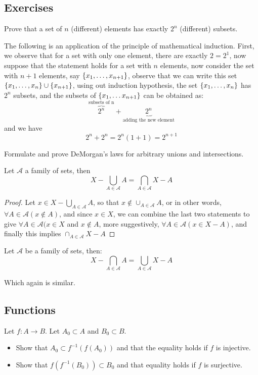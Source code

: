\subsection{Exercises}

\begin{exc}
	Prove that a set of $ n $ (different) elements has exactly $ 2^n  $ (different) subsets.
\end{exc}
\begin{sol}
	The following is an application of the principle of mathematical induction. First, we observe that for a set with only one element, there are exactly $ 2 = 2^1 $, now suppose that the statement holds for a set with $ n $ elements, now consider the set with $ n+1 $ elements, say $ \left\lbrace x_1, \ldots,x_{n+1} \right\rbrace $, observe that we can write this set $ \left\lbrace x_1, \ldots, x_n \right\rbrace \cup \left\lbrace x_{n+1} \right\rbrace $, using out induction hypothesis, the set $ \left\lbrace x_1, \ldots, x_n \right\rbrace $ has $ 2^n $ subsets, and the subsets of $ \left\lbrace x_1, \ldots x_{n+1} \right\rbrace $ can be obtained as:
	\[ \overbrace{2^n}^\text{subsets of n} + \underbrace{2^n}_\text{adding the new element}\]
	and we have
	\[ 2^n + 2^n = 2^n(1+1) = 2^{n+1} \]
\end{sol}
\begin{exc}
	Formulate and prove DeMorgan's laws for arbitrary unions and intersections.
\end{exc}
\begin{sol}
	\begin{prop}
		Let $ \mathcal{A} $ a family of sets, then 
		\[ X - \bigcup_{A \in \mathcal{A}} A = \bigcap_{ A \in \mathcal{A}} X - A \] 
	\end{prop}
	\begin{proof}
		Let $ x \in X - \bigcup_{A \in \mathcal{A}} A $, so that $ x \notin \cup_{A \in \mathcal{A}} A $, or in other words, $ \forall A \in \mathcal{A} (x \not \in A)$, and since $ x \in X $, we can combine the last two statements to give $ \forall A \in \mathcal{A} (x \in X $ and $ x \not \in A $, more suggestively, $ \forall A \in \mathcal{A} ( x \in X - A) $, and finally this implies $ \cap_{A \in \mathcal{A}} X-A  $
	\end{proof}
	\begin{prop}
		Let $ \mathcal{A} $ be a family of sets, then:
		\[ X - \bigcap_{A \in \mathcal{A}} A = \bigcup_{A \in \mathcal{A}} X - A \]
	\end{prop}
	Which again is similar.
\end{sol}

\subsection{Functions}
\begin{exc}
	Let $ f: A \rightarrow B $. Let $ A_0 \subset A $ and $ B_0 \subset B $.
	\begin{itemize}
		\item Show that $ A_0 \subset f^{-1}(f(A_0)) $ and that the equality holds if $ f $ is injective.
		\item Show that $ f(f^{-1}(B_0)) \subset B_0 $ and that equality holds if $ f $ is surjective.
	\end{itemize}
\end{exc}

